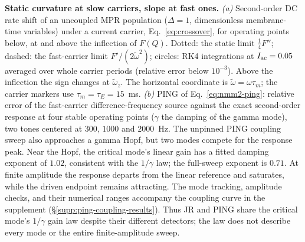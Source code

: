 \documentclass[11pt,a4paper]{article}
\providecommand{\DIFaddtex}[1]{{\protect\color{blue} \sf #1}} %
\providecommand{\DIFdeltex}[1]{{\protect\color{red} \scriptsize #1}} %
\providecommand{\DIFaddbegin}{} %
\providecommand{\DIFaddend}{} %
\providecommand{\DIFdelbegin}{} %
\providecommand{\DIFdelend}{} %
\providecommand{\DIFdelFL}[1]{\DIFdel{#1}} %
\providecommand{\DIFadd}[1]{\texorpdfstring{\DIFaddtex{#1}}{#1}} %
\providecommand{\DIFdel}[1]{\texorpdfstring{\DIFdeltex{#1}}{}} %
\begin{document}
\DIFdelbegin %
{%
\DIFdelFL{\textbf{Static curvature at slow carriers, slope at fast ones.} \emph{(a)}
Second-order DC rate shift of an uncoupled MPR population ($\Delta=1$, dimensionless membrane-time variables) under a
current carrier, Eq.~\eqref{eq:crossover}, for operating points below, at and above the
inflection of $F(Q)$. Dotted: the static limit $\tfrac14F''$; dashed: the fast-carrier
limit $F'/(2\tilde\omega^2)$; circles: RK4 integrations at $I_{\rm ac}=0.05$ averaged over whole carrier
periods (relative error below $10^{-3}$). Above the inflection the sign changes at
$\tilde\omega_z$. The horizontal coordinate is $\tilde\omega=\omega\tau_m$; the carrier markers
use $\tau_m=\tau_E=15$~ms. \emph{(b)} PING of Eq.~\eqref{eq:nmm2-ping}: relative error of the
fast-carrier difference-frequency source against the exact second-order response at four
stable operating points ($\gamma$ the damping of the gamma mode), two tones centered at
$300$, $1000$ and $2000$~Hz.}}
\DIFdelend \DIFaddbegin \DIFadd{The unpinned PING coupling sweep also approaches a gamma Hopf, but two
modes compete for the response peak. Near the Hopf, the critical mode's
linear gain has a fitted damping exponent of $1.02$, consistent with the
$1/\gamma$ law; the full-sweep exponent is $0.71$. At finite amplitude the response departs from the linear
reference and saturates, while the driven endpoint remains attracting.
The mode tracking, amplitude checks, and their numerical ranges accompany
the coupling curve in the supplement (\S\ref{supp:ping-coupling-results}).
Thus JR and PING share the critical mode's $1/\gamma$ gain law despite
their different detectors; the law does not describe every mode or the
entire finite-amplitude sweep.
}\DIFaddend
\end{document}
